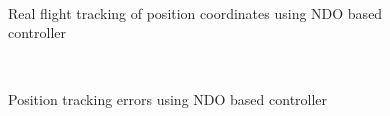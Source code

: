 \documentclass[letterpaper%
, twoside%
, 12pt%
,memoire%
, english%
,creativecommons,hyperref%
]{thETS}
\begin{document}
\begin{figure}[H]
	\centering
	 \\ \parbox{0.75\textwidth}{\caption{Real flight tracking of position coordinates using NDO based controller\label{Fig:xyztracNDO}}}
\end{figure}

\begin{figure}[H]
	\centering
	 \\ \parbox{0.75\textwidth}{\caption{Position tracking errors using NDO based controller\label{Fig:xyzerrNDO}}}
\end{figure}
\end{document}
